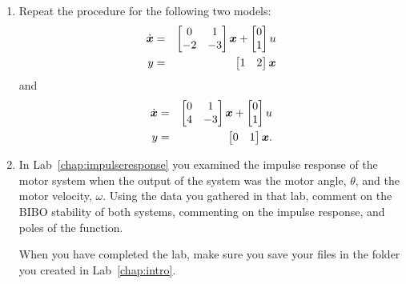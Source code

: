 \begin{enumerate}
    \item Repeat the procedure for the following two models:
          \begin{eqnarray*}
              \dot{\boldsymbol{x}}&=&\begin{bmatrix}0&1\\-2&-3\\\end{bmatrix}\boldsymbol{x}+
              \begin{bmatrix}0\\1\end{bmatrix}u\\
              y&=&\begin{bmatrix}1&2\end{bmatrix}\boldsymbol{x}
          \end{eqnarray*}
          and
          \begin{eqnarray*}
              \dot{\boldsymbol{x}}&=&\begin{bmatrix}0&1\\4&-3\\\end{bmatrix}\boldsymbol{x}+
              \begin{bmatrix}0\\1\end{bmatrix}u\\
              y&=&\begin{bmatrix}0&1\end{bmatrix}\boldsymbol{x}.
          \end{eqnarray*}

    \item In Lab~\ref{chap:impulseresponse} you examined the impulse response of
          the motor system when the output of the system was the motor angle,
          \(\theta \), and the motor velocity, \(\omega \).  Using the data you gathered
          in that lab, comment on the BIBO stability of both systems, commenting on the
          impulse response, and poles of the function.

          When you have completed the lab, make sure you save your files in the folder
          you created in Lab~\ref{chap:intro}.
\end{enumerate}

